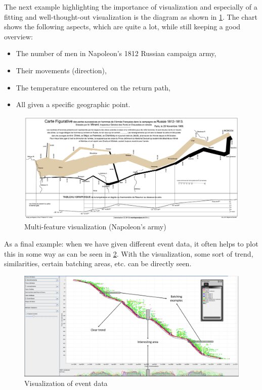 The next example highlighting the importance of visualization and especially of a fitting and well-thought-out visualization is the diagram as shown in \ref{fig:2_napoleon}. The chart shows the following aspects, which are quite a lot, while still keeping a good overview:
\begin{itemize}
  \item The number of men in Napoleon's 1812 Russian campaign army,
  \item Their movements (direction),
  \item The temperature encountered on the return path,
  \item All given a specific geographic point.
\end{itemize}

\begin{figure}[H]
  \centering
  \includegraphics[width=\textwidth]{assets/visualization_and_extraction/napolean.png}
  \caption{Multi-feature visualization (Napoleon's army)}
  \label{fig:2_napoleon}
\end{figure}

As a final example: when we have given different event data, it often helps to plot this in some way as can be seen in \ref{fig:2_event_data}. With the visualization, some sort of trend, similarities, certain batching areas, etc. can be directly seen.

\begin{figure}[H]
  \centering
  \includegraphics[width=\textwidth]{assets/visualization_and_extraction/event_data_visualization.png}
  \caption{Visualization of event data}
  \label{fig:2_event_data}
\end{figure}


